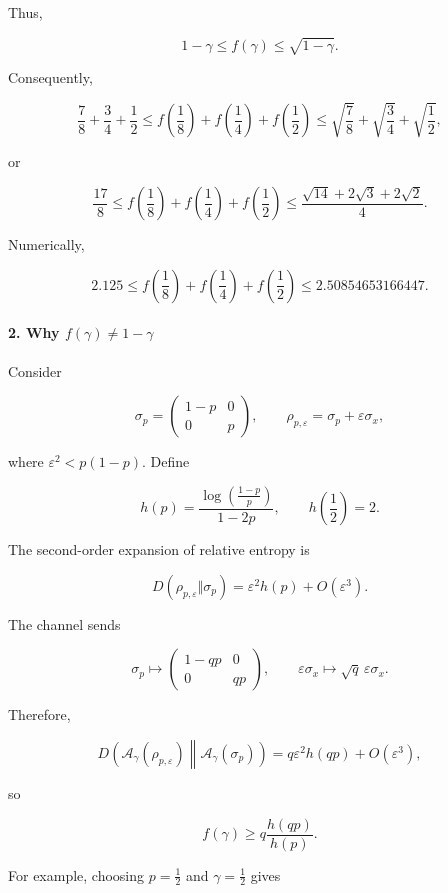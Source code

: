 \documentclass[11pt]{article}
\begin{document}
Thus,

\[
1-\gamma\leq f(\gamma)\leq\sqrt{1-\gamma}.
\]

Consequently,

\[
\frac78+\frac34+\frac12
\leq
f\left(\frac18\right)+f\left(\frac14\right)+f\left(\frac12\right)
\leq
\sqrt{\frac78}+\sqrt{\frac34}+\sqrt{\frac12},
\]

or

\[
\boxed{
\frac{17}{8}
\leq
f\left(\frac18\right)+f\left(\frac14\right)+f\left(\frac12\right)
\leq
\frac{\sqrt{14}+2\sqrt3+2\sqrt2}{4}
}.
\]

Numerically,

\[
2.125
\leq
f\left(\frac18\right)+f\left(\frac14\right)+f\left(\frac12\right)
\leq
2.50854653166447.
\]

\paragraph*{2. Why $f(\gamma)\neq1-\gamma$}

Consider

\[
\sigma_p=
\begin{pmatrix}
1-p&0\\
0&p
\end{pmatrix},
\qquad
\rho_{p,\varepsilon}
=
\sigma_p+\varepsilon\sigma_x,
\]

where $\varepsilon^2<p(1-p)$. Define

\[
h(p)=
\frac{\log\!\left(\frac{1-p}{p}\right)}{1-2p},
\qquad h\left(\frac12\right)=2.
\]

The second-order expansion of relative entropy is

\[
D(\rho_{p,\varepsilon}\Vert\sigma_p)
=
\varepsilon^2h(p)+O(\varepsilon^3).
\]

The channel sends

\[
\sigma_p\longmapsto
\begin{pmatrix}
1-qp&0\\
0&qp
\end{pmatrix},
\qquad
\varepsilon\sigma_x\longmapsto
\sqrt q\,\varepsilon\sigma_x.
\]

Therefore,

\[
D\!\left(
\mathcal A_\gamma(\rho_{p,\varepsilon})
\middle\|
\mathcal A_\gamma(\sigma_p)
\right)
=
q\varepsilon^2h(qp)+O(\varepsilon^3),
\]

so

\[
f(\gamma)\geq
q\frac{h(qp)}{h(p)}.
\]

For example, choosing $p=\tfrac12$ and $\gamma=\tfrac12$ gives
\end{document}
